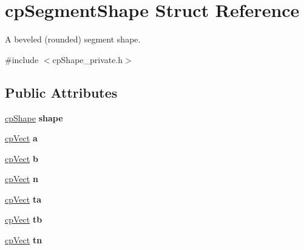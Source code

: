 \hypertarget{structcp_segment_shape}{}\section{cp\+Segment\+Shape Struct Reference}
\label{structcp_segment_shape}


A beveled (rounded) segment shape.  




{\ttfamily \#include $<$cp\+Shape\+\_\+private.\+h$>$}

\subsection*{Public Attributes}
\begin{DoxyCompactItemize}
\item 
\hypertarget{structcp_segment_shape_a297ffe552e3a9d7ae39737826c67d3f9}{}\hyperlink{structcp_shape}{cp\+Shape} {\bfseries shape}\label{structcp_segment_shape_a297ffe552e3a9d7ae39737826c67d3f9}

\item 
\hypertarget{structcp_segment_shape_a34a7cf4976358bd14bc0dbc662e22794}{}\hyperlink{structcp_vect}{cp\+Vect} {\bfseries a}\label{structcp_segment_shape_a34a7cf4976358bd14bc0dbc662e22794}

\item 
\hypertarget{structcp_segment_shape_afa81da45c15f6482058f32ababf3c255}{}\hyperlink{structcp_vect}{cp\+Vect} {\bfseries b}\label{structcp_segment_shape_afa81da45c15f6482058f32ababf3c255}

\item 
\hypertarget{structcp_segment_shape_a0698e58f6324e4b040f0616c70e5de21}{}\hyperlink{structcp_vect}{cp\+Vect} {\bfseries n}\label{structcp_segment_shape_a0698e58f6324e4b040f0616c70e5de21}

\item 
\hypertarget{structcp_segment_shape_a7a9a854616a9bd489875be1642d775a5}{}\hyperlink{structcp_vect}{cp\+Vect} {\bfseries ta}\label{structcp_segment_shape_a7a9a854616a9bd489875be1642d775a5}

\item 
\hypertarget{structcp_segment_shape_a391ea2a44caf04f55cd9301b12193490}{}\hyperlink{structcp_vect}{cp\+Vect} {\bfseries tb}\label{structcp_segment_shape_a391ea2a44caf04f55cd9301b12193490}

\item 
\hypertarget{structcp_segment_shape_a7114c5b41b18413750ab73852fe45400}{}\hyperlink{structcp_vect}{cp\+Vect} {\bfseries tn}\label{structcp_segment_shape_a7114c5b41b18413750ab73852fe45400}


\end{DoxyCompactItemize}
